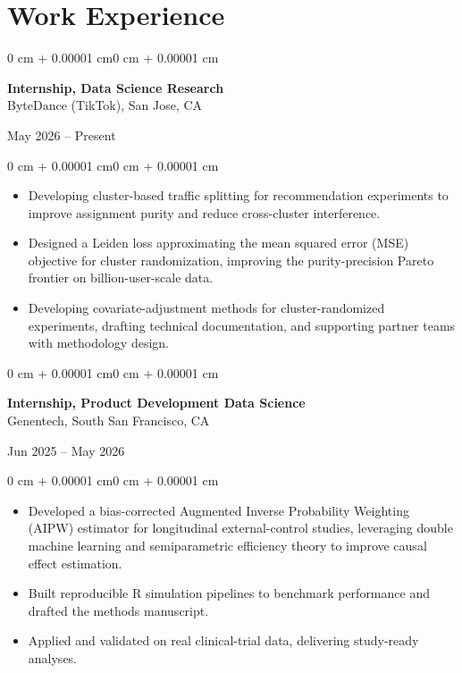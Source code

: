 \documentclass[10pt, letterpaper]{article}
\newenvironment{highlights}{
    \begin{itemize}[
        topsep=0.10 cm,
        parsep=0.10 cm,
        partopsep=0pt,
        itemsep=0pt,
        leftmargin=0 cm + 10pt
    ]
}{\end{itemize}}
\newenvironment{onecolentry}{
    \begin{adjustwidth}{0 cm + 0.00001 cm}{0 cm + 0.00001 cm}
}{\end{adjustwidth}}
\newenvironment{twocolentry}[2][]{
    \onecolentry
    \def\secondColumn{#2}
    \noindent\begin{minipage}[t]{\dimexpr\linewidth-4.7cm\relax}
}{
    \end{minipage}\hfill
    \begin{minipage}[t]{4.5cm}
        \raggedleft \secondColumn
    \end{minipage}
    \endonecolentry
}
\begin{document}
\section{Work Experience}

\begin{twocolentry}{May 2026 -- Present}
\textbf{Internship, Data Science Research}\\
ByteDance (TikTok), San Jose, CA
\end{twocolentry}

\vspace{0.1cm}
\begin{onecolentry}
    \begin{highlights}
        \item Developing cluster-based traffic splitting for recommendation experiments to improve assignment purity and reduce cross-cluster interference.
        \item Designed a Leiden loss approximating the mean squared error (MSE) objective for cluster randomization, improving the purity-precision Pareto frontier on billion-user-scale data.
        \item Developing covariate-adjustment methods for cluster-randomized experiments, drafting technical documentation, and supporting partner teams with methodology design.
    \end{highlights}
\end{onecolentry}

\vspace{0.20 cm}

\begin{twocolentry}{Jun 2025 -- May 2026}
\textbf{Internship, Product Development Data Science}\\
Genentech, South San Francisco, CA
\end{twocolentry}

\vspace{0.1cm}
\begin{onecolentry}
    \begin{highlights}
        \item Developed a bias-corrected Augmented Inverse Probability Weighting (AIPW) estimator for longitudinal external-control studies, leveraging double machine learning and semiparametric efficiency theory to improve causal effect estimation.
        \item Built reproducible R simulation pipelines to benchmark performance and drafted the  methods manuscript.
        \item Applied and validated on real clinical-trial data, delivering study-ready analyses.
    \end{highlights}
\end{onecolentry}
\end{document}
